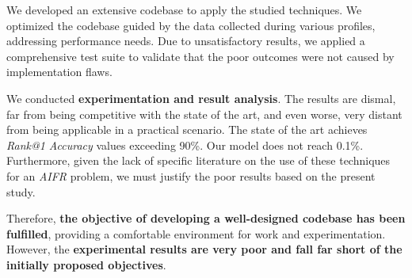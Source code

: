 We developed an extensive codebase to apply the studied techniques. We optimized the codebase guided by the data collected during various profiles, addressing performance needs. Due to unsatisfactory results, we applied a comprehensive test suite to validate that the poor outcomes were not caused by implementation flaws.

We conducted \textbf{experimentation and result analysis}. The results are dismal, far from being competitive with the state of the art, and even worse, very distant from being applicable in a practical scenario. The state of the art achieves \textit{Rank@1 Accuracy} values exceeding 90\%. Our model does not reach 0.1\%. Furthermore, given the lack of specific literature on the use of these techniques for an \textit{AIFR} problem, we must justify the poor results based on the present study.

Therefore, \textbf{the objective of developing a well-designed codebase has been fulfilled}, providing a comfortable environment for work and experimentation. However, the \textbf{experimental results are very poor and fall far short of the initially proposed objectives}.


\endinput
